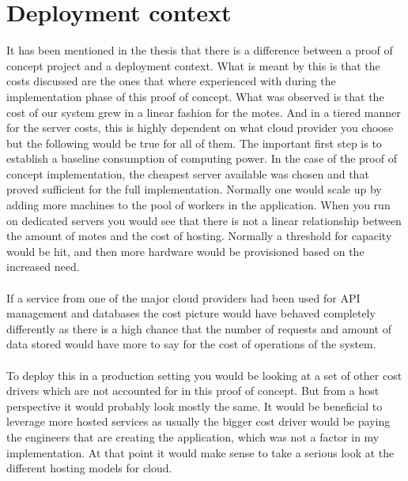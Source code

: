 \documentclass[]{uiophd}
\begin{document}
\section{Deployment context}
It has been mentioned in the thesis that there is a difference between a proof of concept project and a deployment context. What is meant by this is that the costs discussed are the ones that where experienced with during the implementation phase of this proof of concept. What was observed is that the cost of our system grew in a linear fashion for the motes. And in a tiered manner for the server costs, this is highly dependent on what cloud provider you choose but the following would be true for all of them. The important first step is to establish a baseline consumption of computing power. In the case of the proof of concept implementation, the cheapest server available was chosen and that proved sufficient for the full implementation. Normally one would scale up by adding more machines to the pool of workers in the application. When you run on dedicated servers you would see that there is not a linear relationship between the amount of motes and the cost of hosting. Normally a threshold for capacity would be hit, and then more hardware would be provisioned based on the increased need.
\\\\
If a service from one of the major cloud providers had been used for API management and databases the cost picture would have behaved completely differently as there is a high chance that the number of requests and amount of data stored would have more to say for the cost of operations of the system.
\\\\
To deploy this in a production setting you would be looking at a set of other cost drivers which are not accounted for in this proof of concept. But from a host perspective it would probably look mostly the same. It would be beneficial to leverage more hosted services as usually the bigger cost driver would be paying the engineers that are creating the application, which was not a factor in my implementation. At that point it would make sense to take a serious look at the different hosting models for cloud.
\\\\
\end{document}
